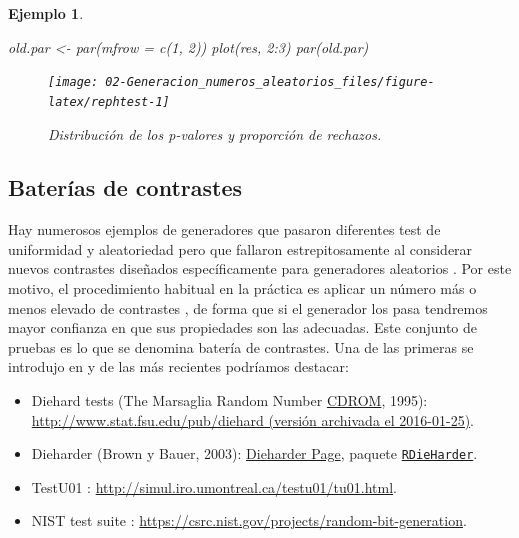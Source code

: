 \documentclass[
  10pt,
]{book}
\newenvironment{Shaded}{\begin{snugshade}}{\end{snugshade}}
\newcommand{\AttributeTok}[1]{\textcolor[rgb]{0.77,0.63,0.00}{#1}}
\newcommand{\DecValTok}[1]{\textcolor[rgb]{0.00,0.00,0.81}{#1}}
\newcommand{\FunctionTok}[1]{\textcolor[rgb]{0.00,0.00,0.00}{#1}}
\newcommand{\NormalTok}[1]{#1}
\newcommand{\OtherTok}[1]{\textcolor[rgb]{0.56,0.35,0.01}{#1}}
\newcommand{\SpecialCharTok}[1]{\textcolor[rgb]{0.00,0.00,0.00}{#1}}
\theoremstyle{break}
\newtheorem{example}{Ejemplo}[chapter]
\theoremstyle{nonumberplain}
\begin{document}
\begin{example}
\begin{Shaded}
\begin{Highlighting}[]
\NormalTok{old.par }\OtherTok{\textless{}{-}} \FunctionTok{par}\NormalTok{(}\AttributeTok{mfrow =} \FunctionTok{c}\NormalTok{(}\DecValTok{1}\NormalTok{, }\DecValTok{2}\NormalTok{))}
\FunctionTok{plot}\NormalTok{(res, }\DecValTok{2}\SpecialCharTok{:}\DecValTok{3}\NormalTok{)}
\FunctionTok{par}\NormalTok{(old.par)}
\end{Highlighting}
\end{Shaded}

\begin{figure}[!htbp]

{\centering \texttt{[image: 02-Generacion\_numeros\_aleatorios\_files/figure-latex/rephtest-1]} 

}

\caption{Distribución de los p-valores y proporción de rechazos.}\label{fig:rephtest}
\end{figure}

\end{example}

\hypertarget{baterias}{%
\subsection{Baterías de contrastes}\label{baterias}}

Hay numerosos ejemplos de generadores que pasaron diferentes test de uniformidad y aleatoriedad pero que fallaron estrepitosamente al considerar nuevos contrastes diseñados específicamente para generadores aleatorios \citep[ver][]{marsaglia1990}.
Por este motivo, el procedimiento habitual en la práctica es aplicar un número más o menos elevado de contrastes \citep[de distinto tipo y difíciles de pasar, e.g.][]{marsaglia2002}, de forma que si el generador los pasa tendremos mayor confianza en que sus propiedades son las adecuadas.
Este conjunto de pruebas es lo que se denomina batería de contrastes. Una de las primeras se introdujo en \citet{knuth1969} y de las más recientes podríamos destacar:

\begin{itemize}
\item
  Diehard tests (The Marsaglia Random Number \href{https://ani.stat.fsu.edu/diehard}{CDROM}, 1995):
  \href{https://web.archive.org/web/20160125103112/http://stat.fsu.edu/pub/diehard}{http://www.stat.fsu.edu/pub/diehard (versión archivada el 2016-01-25)}.
\item
  Dieharder (Brown y Bauer, 2003):
  \href{https://webhome.phy.duke.edu/~rgb/General/dieharder.php}{Dieharder Page},
  paquete \href{https://github.com/eddelbuettel/rdieharder}{\texttt{RDieHarder}}.
\item
  TestU01 \citep{lecuyer07}:
  \url{http://simul.iro.umontreal.ca/testu01/tu01.html}.
\item
  NIST test suite \citep[National Institute of Standards and Technology, Cryptographic Technology Group,][]{nistsp2010}:
  \href{https://csrc.nist.gov/Projects/random-bit-generation/Documentation-and-Software}{https://csrc.nist.gov/projects/random-bit-generation}.
\end{itemize}
\end{document}

